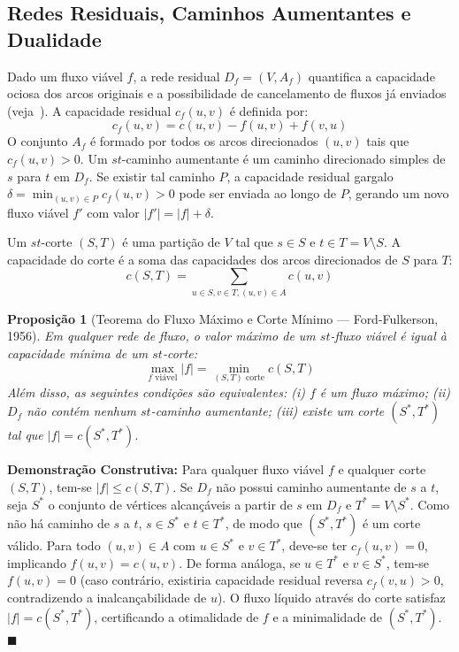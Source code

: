 \documentclass[12pt,a4paper]{article}
\newtheorem{prop}{Proposição}
\begin{document}
\subsection{Redes Residuais, Caminhos Aumentantes e Dualidade}

Dado um fluxo viável $f$, a rede residual $D_f = (V, A_f)$ quantifica a capacidade ociosa dos arcos originais e a possibilidade de cancelamento de fluxos já enviados (veja~\cite{ahuja1993network}). A capacidade residual $c_f(u, v)$ é definida por:
\begin{equation}
    c_f(u, v) = c(u, v) - f(u, v) + f(v, u)
\end{equation}
O conjunto $A_f$ é formado por todos os arcos direcionados $(u, v)$ tais que $c_f(u, v) > 0$. Um $st$-caminho aumentante é um caminho direcionado simples de $s$ para $t$ em $D_f$. Se existir tal caminho $P$, a capacidade residual gargalo $\delta = \min_{(u, v) \in P} c_f(u, v) > 0$ pode ser enviada ao longo de $P$, gerando um novo fluxo viável $f'$ com valor $|f'| = |f| + \delta$.

Um $st$-corte $(S, T)$ é uma partição de $V$ tal que $s \in S$ e $t \in T = V \setminus S$. A capacidade do corte é a soma das capacidades dos arcos direcionados de $S$ para $T$:
\begin{equation}
    c(S, T) = \sum_{u \in S, v \in T, (u, v) \in A} c(u, v)
\end{equation}

\begin{prop}[Teorema do Fluxo Máximo e Corte Mínimo --- Ford-Fulkerson, 1956]\label{prop:mfmc_rel}
Em qualquer rede de fluxo, o valor máximo de um $st$-fluxo viável é igual à capacidade mínima de um $st$-corte:
\begin{equation}
    \max_{f \text{ viável}} |f| = \min_{(S, T) \text{ corte}} c(S, T)
\end{equation}
Além disso, as seguintes condições são equivalentes: (i) $f$ é um fluxo máximo; (ii) $D_f$ não contém nenhum $st$-caminho aumentante; (iii) existe um corte $(S^*, T^*)$ tal que $|f| = c(S^*, T^*)$.
\end{prop}

\noindent \textbf{Demonstração Construtiva:} Para qualquer fluxo viável $f$ e qualquer corte $(S, T)$, tem-se $|f| \le c(S, T)$. Se $D_f$ não possui caminho aumentante de $s$ a $t$, seja $S^*$ o conjunto de vértices alcançáveis a partir de $s$ em $D_f$ e $T^* = V \setminus S^*$. Como não há caminho de $s$ a $t$, $s \in S^*$ e $t \in T^*$, de modo que $(S^*, T^*)$ é um corte válido. Para todo $(u, v) \in A$ com $u \in S^*$ e $v \in T^*$, deve-se ter $c_f(u, v) = 0$, implicando $f(u, v) = c(u, v)$. De forma análoga, se $u \in T^*$ e $v \in S^*$, tem-se $f(u, v) = 0$ (caso contrário, existiria capacidade residual reversa $c_f(v, u) > 0$, contradizendo a inalcançabilidade de $u$). O fluxo líquido através do corte satisfaz $|f| = c(S^*, T^*)$, certificando a otimalidade de $f$ e a minimalidade de $(S^*, T^*)$. \hfill $\blacksquare$
\end{document}

